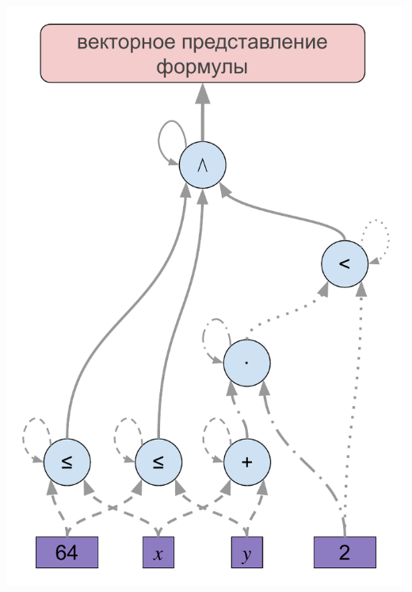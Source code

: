 \documentclass[14pt,aspectratio=169,hyperref={pdftex,unicode},xcolor=dvipsnames]{beamer}
\begin{document}
\begin{frame}[noframenumbering]

\begin{center}
  \includegraphics[scale=0.45]{./assets/formula-ast-talk-0.pdf}
\end{center}

\end{frame}
\end{document}

